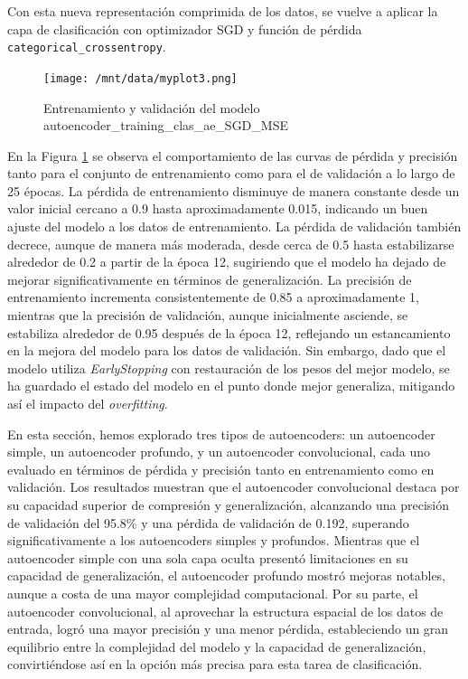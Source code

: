 Con esta nueva representación comprimida de los datos, se vuelve a aplicar la capa de clasificación con optimizador SGD y función de pérdida \lstinline|categorical_crossentropy|.

\begin{figure}[H]
    \centering
    \texttt{[image: /mnt/data/myplot3.png]}
    \caption{Entrenamiento y validación del modelo autoencoder\_training\_clas\_ae\_SGD\_MSE}
    \label{fig:resultados_daec}
\end{figure}

En la Figura \ref{fig:resultados_daec} se observa el comportamiento de las curvas de pérdida y precisión tanto para el conjunto de entrenamiento como para el de validación a lo largo de 25 épocas. La pérdida de entrenamiento disminuye de manera constante desde un valor inicial cercano a 0.9 hasta aproximadamente 0.015, indicando un buen ajuste del modelo a los datos de entrenamiento. La pérdida de validación también decrece, aunque de manera más moderada, desde cerca de 0.5 hasta estabilizarse alrededor de 0.2 a partir de la época 12, sugiriendo que el modelo ha dejado de mejorar significativamente en términos de generalización. La precisión de entrenamiento incrementa consistentemente de 0.85 a aproximadamente 1, mientras que la precisión de validación, aunque inicialmente asciende, se estabiliza alrededor de 0.95 después de la época 12, reflejando un estancamiento en la mejora del modelo para los datos de validación. Sin embargo, dado que el modelo utiliza \textit{EarlyStopping} con restauración de los pesos del mejor modelo, se ha guardado el estado del modelo en el punto donde mejor generaliza, mitigando así el impacto del \textit{overfitting}.


En esta sección, hemos explorado tres tipos de autoencoders: un autoencoder simple, un autoencoder profundo, y un autoencoder convolucional, cada uno evaluado en términos de pérdida y precisión tanto en entrenamiento como en validación. Los resultados muestran que el autoencoder convolucional destaca por su capacidad superior de compresión y generalización, alcanzando una precisión de validación del 95.8\% y una pérdida de validación de 0.192, superando significativamente a los autoencoders simples y profundos. Mientras que el autoencoder simple con una sola capa oculta presentó limitaciones en su capacidad de generalización, el autoencoder profundo mostró mejoras notables, aunque a costa de una mayor complejidad computacional. Por su parte, el autoencoder convolucional, al aprovechar la estructura espacial de los datos de entrada, logró una mayor precisión y una menor pérdida, estableciendo un gran equilibrio entre la complejidad del modelo y la capacidad de generalización, convirtiéndose así en la opción más precisa para esta tarea de clasificación.


